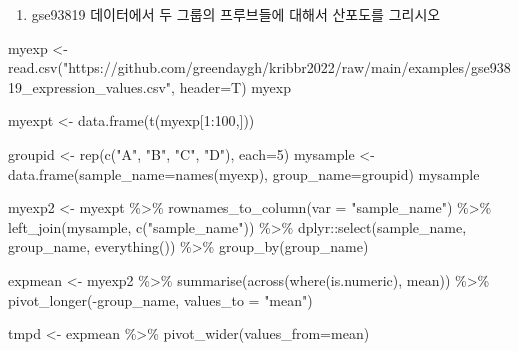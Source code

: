 \documentclass[
]{book}
\newenvironment{Shaded}{\begin{snugshade}}{\end{snugshade}}
\newcommand{\AttributeTok}[1]{\textcolor[rgb]{0.77,0.63,0.00}{#1}}
\newcommand{\DecValTok}[1]{\textcolor[rgb]{0.00,0.00,0.81}{#1}}
\newcommand{\FunctionTok}[1]{\textcolor[rgb]{0.00,0.00,0.00}{#1}}
\newcommand{\NormalTok}[1]{#1}
\newcommand{\OtherTok}[1]{\textcolor[rgb]{0.56,0.35,0.01}{#1}}
\newcommand{\SpecialCharTok}[1]{\textcolor[rgb]{0.00,0.00,0.00}{#1}}
\newcommand{\StringTok}[1]{\textcolor[rgb]{0.31,0.60,0.02}{#1}}
\providecommand{\tightlist}{%
  \setlength{\itemsep}{0pt}\setlength{\parskip}{0pt}}
\begin{document}
\begin{enumerate}
\def\labelenumi{\arabic{enumi}.}
\tightlist
\item
  gse93819 데이터에서 두 그룹의 프루브들에 대해서 산포도를 그리시오
\end{enumerate}

\begin{Shaded}
\begin{Highlighting}[]
\NormalTok{myexp }\OtherTok{\textless{}{-}} \FunctionTok{read.csv}\NormalTok{(}\StringTok{"https://github.com/greendaygh/kribbr2022/raw/main/examples/gse93819\_expression\_values.csv"}\NormalTok{, }\AttributeTok{header=}\NormalTok{T)}
\NormalTok{myexp}

\NormalTok{myexpt }\OtherTok{\textless{}{-}} \FunctionTok{data.frame}\NormalTok{(}\FunctionTok{t}\NormalTok{(myexp[}\DecValTok{1}\SpecialCharTok{:}\DecValTok{100}\NormalTok{,]))}

\NormalTok{groupid }\OtherTok{\textless{}{-}} \FunctionTok{rep}\NormalTok{(}\FunctionTok{c}\NormalTok{(}\StringTok{"A"}\NormalTok{, }\StringTok{"B"}\NormalTok{, }\StringTok{"C"}\NormalTok{, }\StringTok{"D"}\NormalTok{), }\AttributeTok{each=}\DecValTok{5}\NormalTok{)}
\NormalTok{mysample }\OtherTok{\textless{}{-}} \FunctionTok{data.frame}\NormalTok{(}\AttributeTok{sample\_name=}\FunctionTok{names}\NormalTok{(myexp), }\AttributeTok{group\_name=}\NormalTok{groupid)}
\NormalTok{mysample}

\NormalTok{myexp2 }\OtherTok{\textless{}{-}}\NormalTok{ myexpt }\SpecialCharTok{\%\textgreater{}\%} 
  \FunctionTok{rownames\_to\_column}\NormalTok{(}\AttributeTok{var =} \StringTok{"sample\_name"}\NormalTok{) }\SpecialCharTok{\%\textgreater{}\%} 
  \FunctionTok{left\_join}\NormalTok{(mysample, }\FunctionTok{c}\NormalTok{(}\StringTok{"sample\_name"}\NormalTok{)) }\SpecialCharTok{\%\textgreater{}\%} 
\NormalTok{  dplyr}\SpecialCharTok{::}\FunctionTok{select}\NormalTok{(sample\_name, group\_name, }\FunctionTok{everything}\NormalTok{()) }\SpecialCharTok{\%\textgreater{}\%} 
  \FunctionTok{group\_by}\NormalTok{(group\_name) }


\NormalTok{expmean }\OtherTok{\textless{}{-}}\NormalTok{ myexp2 }\SpecialCharTok{\%\textgreater{}\%} 
  \FunctionTok{summarise}\NormalTok{(}\FunctionTok{across}\NormalTok{(}\FunctionTok{where}\NormalTok{(is.numeric), mean)) }\SpecialCharTok{\%\textgreater{}\%} 
  \FunctionTok{pivot\_longer}\NormalTok{(}\SpecialCharTok{{-}}\NormalTok{group\_name, }\AttributeTok{values\_to =} \StringTok{"mean"}\NormalTok{)}

\NormalTok{tmpd }\OtherTok{\textless{}{-}}\NormalTok{ expmean }\SpecialCharTok{\%\textgreater{}\%} 
  \FunctionTok{pivot\_wider}\NormalTok{(}\AttributeTok{values\_from=}\NormalTok{mean) }


\end{Highlighting}
\end{Shaded}
\end{document}
